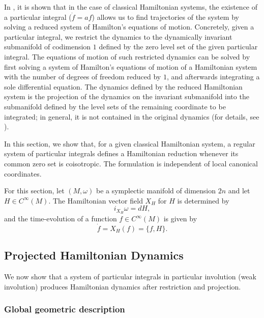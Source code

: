 \documentclass[10pt,a4paper]{article}
\begin{document}
In \cite{escobar2024particular}, it is shown that in the case of classical Hamiltonian systems, the existence of a particular integral ($\dot{f}=af$) allows us to find trajectories of the system by solving a reduced system of Hamilton's equations of motion. Concretely, given a particular integral, we restrict the dynamics to the dynamically invariant submanifold of codimension $1$ defined by the zero level set of the given particular integral. The equations of motion of such restricted dynamics can be solved by first solving a system of Hamilton's equations of motion of a Hamiltonian system with the number of degrees of freedom reduced by $1$, and afterwards integrating a sole differential equation.  The dynamics defined by the reduced Hamiltonian system is the projection of the dynamics on the invariant submanifold into the submanifold defined by the level sets of the remaining coordinate to be integrated;  in general, it is not contained in the original dynamics (for details, see \cite{escobar2024particular}). 

In this section, we show that, for a given classical Hamiltonian system, a regular system of particular integrals defines a Hamiltonian reduction whenever its common zero set is coisotropic.  The formulation is independent of local canonical coordinates.

For this section, let $(M,\omega)$ be a symplectic manifold of dimension $2n$ and let $H\in C^\infty(M)$. The Hamiltonian vector field $X_{H}$ for $H$ is determined by
\begin{equation*}
i_{X_H}\omega= dH,
\end{equation*}
and the time-evolution of a function $f\in C^{\infty}(M)$ is given by
\begin{equation*}
\dot f=X_H(f)=\{f,H\}.
\end{equation*}



\subsection{Projected Hamiltonian Dynamics}

We now show that a system of particular integrals in particular involution (weak involution) produces Hamiltonian dynamics after restriction and projection.


\subsubsection{Global geometric description}
\end{document}
